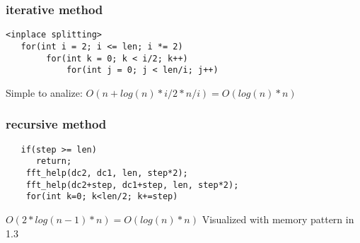 \subsubsection{iterative method}
\begin{lstlisting}
<inplace splitting>
   for(int i = 2; i <= len; i *= 2)
        for(int k = 0; k < i/2; k++)
            for(int j = 0; j < len/i; j++)

\end{lstlisting}
Simple to analize:
\begin{math}
O(n + log(n) * i/2 * n/i) = O(log(n)*n)
\end{math}
\subsubsection{recursive method}
\begin{lstlisting}
   if(step >= len)
      return;
    fft_help(dc2, dc1, len, step*2);
    fft_help(dc2+step, dc1+step, len, step*2);
    for(int k=0; k<len/2; k+=step)
\end{lstlisting}
\begin{math}
O(2*log(n-1) * n) = O(log(n)*n)
\end{math}\newline
Visualized with memory pattern in 1.3